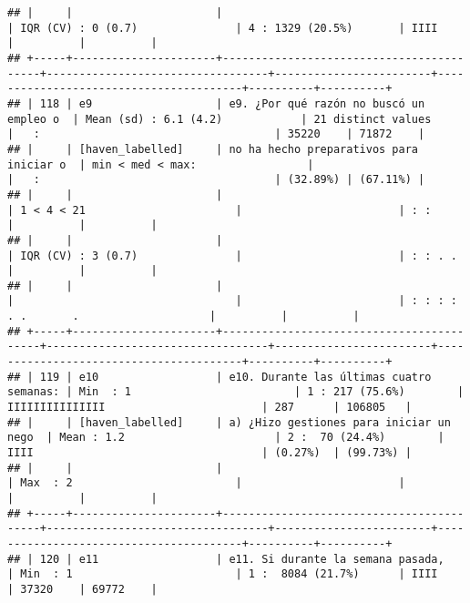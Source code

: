 \documentclass[]{article}
\begin{document}
\begin{verbatim}
## |     |                      |                                          | IQR (CV) : 0 (0.7)               | 4 : 1329 (20.5%)       | IIII                                   |          |          |
## +-----+----------------------+------------------------------------------+----------------------------------+------------------------+----------------------------------------+----------+----------+
## | 118 | e9                   | e9. ¿Por qué razón no buscó un empleo o  | Mean (sd) : 6.1 (4.2)            | 21 distinct values     |   :                                    | 35220    | 71872    |
## |     | [haven_labelled]     | no ha hecho preparativos para iniciar o  | min < med < max:                 |                        |   :                                    | (32.89%) | (67.11%) |
## |     |                      |                                          | 1 < 4 < 21                       |                        | : :                                    |          |          |
## |     |                      |                                          | IQR (CV) : 3 (0.7)               |                        | : : . .                                |          |          |
## |     |                      |                                          |                                  |                        | : : : : . .       .                    |          |          |
## +-----+----------------------+------------------------------------------+----------------------------------+------------------------+----------------------------------------+----------+----------+
## | 119 | e10                  | e10. Durante las últimas cuatro semanas: | Min  : 1                         | 1 : 217 (75.6%)        | IIIIIIIIIIIIIII                        | 287      | 106805   |
## |     | [haven_labelled]     | a) ¿Hizo gestiones para iniciar un nego  | Mean : 1.2                       | 2 :  70 (24.4%)        | IIII                                   | (0.27%)  | (99.73%) |
## |     |                      |                                          | Max  : 2                         |                        |                                        |          |          |
## +-----+----------------------+------------------------------------------+----------------------------------+------------------------+----------------------------------------+----------+----------+
## | 120 | e11                  | e11. Si durante la semana pasada,        | Min  : 1                         | 1 :  8084 (21.7%)      | IIII                                   | 37320    | 69772    |

\end{verbatim}
\end{document}
